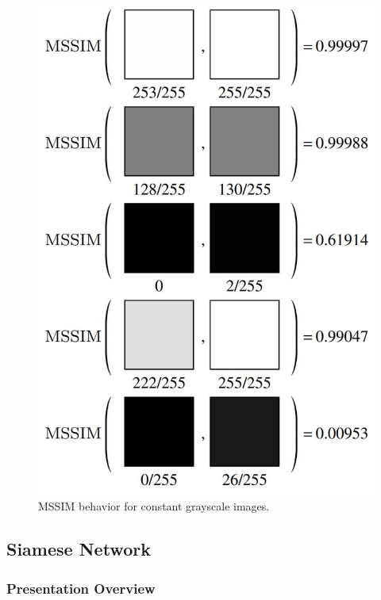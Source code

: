 \documentclass[13.5pt,aspecratio=169, xcolor=dvipsnames]{beamer}
\begin{document}
\begin{frame}
\begin{minipage}{0.39\textwidth}
\begin{figure}
                \includegraphics[width=\linewidth]{MSSIM_Fig_2.jpg}
                \captionsetup{labelformat=empty}
                \caption{{\tiny MSSIM behavior for constant grayscale images. }}
            \end{figure}
        \end{minipage}
        
        
       
\end{frame}
    
\subsection{Siamese Network}

\begin{frame}
    \frametitle{Presentation Overview}
    \tableofcontents[currentsubsection, sectionstyle=show/shaded, subsectionstyle=show/shaded]
\end{frame}
\end{document}

